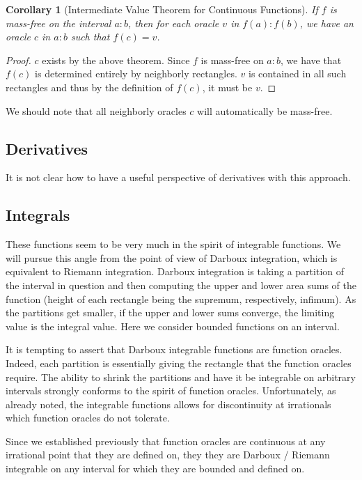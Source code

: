 \documentclass[12pt]{article}
\newtheorem{corollary}{Corollary}
\theoremstyle{remark}
\begin{document}
\begin{corollary}[Intermediate Value Theorem for Continuous Functions]
If $f$ is mass-free on the interval $a:b$, then for each oracle $v$ in $f(a):f(b)$, we have an oracle $c$ in $a:b$ such that $f(c)=v$.
\end{corollary}

\begin{proof}
$c$ exists by the above theorem. Since $f$ is mass-free on $a:b$, we have that $f(c)$ is determined entirely by neighborly rectangles. $v$ is contained in all such rectangles and thus by the definition of $f(c)$, it must be $v$. 
\end{proof}
    
We should note that all neighborly oracles $c$ will automatically be mass-free. 



\subsection{Derivatives}

It is not clear how to have a useful perspective of derivatives with this approach. 

\subsection{Integrals}

These functions seem to be very much in the spirit of integrable functions. We will pursue this angle from the point of view of Darboux integration, which is equivalent to Riemann integration. Darboux integration is taking a partition of the interval in question and then computing the upper and lower area sums of the function (height of each rectangle being the supremum, respectively, infimum). As the partitions get smaller, if the upper and lower sums converge, the limiting value is the integral value. Here we consider bounded functions on an interval. 

It is tempting to assert that Darboux integrable functions are function oracles. Indeed, each partition is essentially giving the rectangle that the function oracles require. The ability to shrink the partitions and have it be integrable on arbitrary intervals strongly conforms to the spirit of function oracles. Unfortunately, as already noted, the integrable functions allows for discontinuity at irrationals which function oracles do not tolerate. 

Since we established previously that function oracles are continuous at any irrational point that they are defined on, they they are Darboux / Riemann integrable on any interval for which they are bounded and defined on. 
\end{document}
